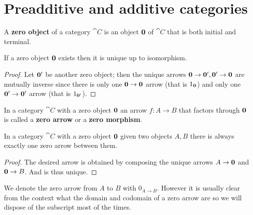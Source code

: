\newpage
\section{Preadditive and additive categories}
\label{sec:preadditive}
\begin{definition}
  \label{def:zero_object}
  A {\bf zero object} of a category \(\cat{C}\) is an object \({\bf 0}\) of \(\cat{C}\)	that is both initial and terminal.
\end{definition}

\begin{proposition}
  \label{prop:zero_object_uniqueness}
  If a zero object \({\bf 0}\) exists then it is unique up to isomorphism.
\end{proposition}

\begin{proof}
  Let \({\bf 0'}\) be another zero object; then the unique arrows \({\bf 0}\to{\bf 0'}, {\bf 0}'\to{\bf 0}\) are mutually inverse since there is only one \({\bf 0}\to{\bf 0}\) arrow (that is \(1_{\bf 0}\)) and only one \({\bf 0'}\to{\bf 0'}\) arrow (that is \(1_{\bf 0'}\)).
\end{proof}

\begin{definition}
  \label{def:zero_arrow}
  In a category \(\cat{C}\) with a zero object \({\bf 0}\) an arrow \(f\colon A\to B\) that factors through \({\bf 0}\) is called a {\bf zero arrow} or a {\bf zero morphism}.
\end{definition}

\begin{proposition}
  \label{prop:existence_of_zero_arrows}
  In a category \(\cat{C}\) with a zero object \({\bf 0}\) given two objects \(A,B\) there is always exactly one zero arrow between them.
\end{proposition}

\begin{proof}
  The desired arrow is obtained by composing the unique arrows \(A\to{\bf 0}\) and \({\bf 0}\to B\). And is thus unique.
\end{proof}

\begin{notation}
  \label{notation:zero_arrows}
  We denote the zero arrow from \(A\) to \(B\) with \(0_{A\to B}\). However it is usually clear from the context what the domain and codomain of a zero arrow are so we will dispose of the subscript most of the times.
\end{notation}

